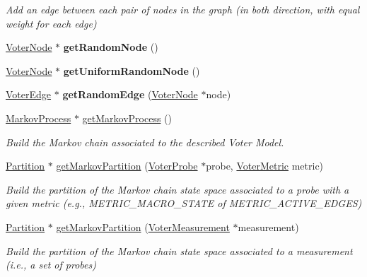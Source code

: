 \begin{DoxyCompactItemize}
\begin{DoxyCompactList}\small\item\em Add an edge between each pair of nodes in the graph (in both direction, with equal weight for each edge) \end{DoxyCompactList}\item 
\hypertarget{classVoterGraph_ac408a931308f3cfd441b0f6a3c9eb6be}{\hyperlink{classVoterNode}{Voter\-Node} $\ast$ {\bfseries get\-Random\-Node} ()}\label{classVoterGraph_ac408a931308f3cfd441b0f6a3c9eb6be}

\item 
\hypertarget{classVoterGraph_a2750643b2dc5bd91fda44a7d79c56c85}{\hyperlink{classVoterNode}{Voter\-Node} $\ast$ {\bfseries get\-Uniform\-Random\-Node} ()}\label{classVoterGraph_a2750643b2dc5bd91fda44a7d79c56c85}

\item 
\hypertarget{classVoterGraph_a3fcc3956fd3d18bb81e1a237527742e1}{\hyperlink{classVoterEdge}{Voter\-Edge} $\ast$ {\bfseries get\-Random\-Edge} (\hyperlink{classVoterNode}{Voter\-Node} $\ast$node)}\label{classVoterGraph_a3fcc3956fd3d18bb81e1a237527742e1}

\item 
\hyperlink{classMarkovProcess}{Markov\-Process} $\ast$ \hyperlink{classVoterGraph_acc86929339ec0a0ce2946146919b1eb7}{get\-Markov\-Process} ()
\begin{DoxyCompactList}\small\item\em Build the Markov chain associated to the described Voter Model. \end{DoxyCompactList}\item 
\hyperlink{classPartition}{Partition} $\ast$ \hyperlink{classVoterGraph_a04231db4297c6a1d4232c5403b202d71}{get\-Markov\-Partition} (\hyperlink{classVoterProbe}{Voter\-Probe} $\ast$probe, \hyperlink{voter__graph_8hpp_acb4c45a5ce4a55eee28e54e60409b9c5}{Voter\-Metric} metric)
\begin{DoxyCompactList}\small\item\em Build the partition of the Markov chain state space associated to a probe with a given metric (e.\-g., M\-E\-T\-R\-I\-C\-\_\-\-M\-A\-C\-R\-O\-\_\-\-S\-T\-A\-T\-E of M\-E\-T\-R\-I\-C\-\_\-\-A\-C\-T\-I\-V\-E\-\_\-\-E\-D\-G\-E\-S) \end{DoxyCompactList}\item 
\hyperlink{classPartition}{Partition} $\ast$ \hyperlink{classVoterGraph_a2c0a299c1249cc04e011d0f507467007}{get\-Markov\-Partition} (\hyperlink{classVoterMeasurement}{Voter\-Measurement} $\ast$measurement)
\begin{DoxyCompactList}\small\item\em Build the partition of the Markov chain state space associated to a measurement (i.\-e., a set of probes) \end{DoxyCompactList}\end{DoxyCompactItemize}
